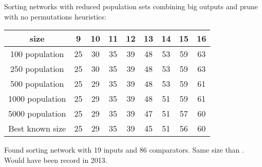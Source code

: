 \documentclass[../main.tex]{subfiles}
\begin{document}
	Sorting networks with reduced population sets combining big outputs and prune with no permutations heuristics:
	\begin{center}
		\begin{tabular}{|c | c c c c c c c c|} 
			\hline
			size & 9 & 10 & 11 & 12 & 13 & 14 & 15 & 16  \\ [0.5ex] 
			\hline\hline
			100 population & 25 & 30 & 35 & 39 & 48 & 53 & 59 & 63 \\ [1ex]
			\hline
			250 population  & 25 & 30 & 35 & 39 & 48 & 53 & 59 & 63 \\  [1ex] 
			\hline
			500 population & 25 & 29 & 35 & 39 & 48 & 53 & 59 & 61 \\  [1ex] 
			\hline
			1000 population & 25 & 29 & 35 & 39 & 48 & 51 & 59 & 61 \\  [1ex] 
			\hline
			5000 population & 25 & 29 & 35 & 39 & 47 & 51 & 57 & 60 \\  [1ex] 
			\hline
			Best known size & 25 & 29 & 35 & 39 & 45 & 51 & 56 & 60 \\  [1ex] 
			\hline
		\end{tabular}
	\end{center}
	
	Found sorting network with 19 inputs and 86 comparators. Same size than \cite{valsalam:jmlr13}. Would have been record in 2013. 
\end{document}
